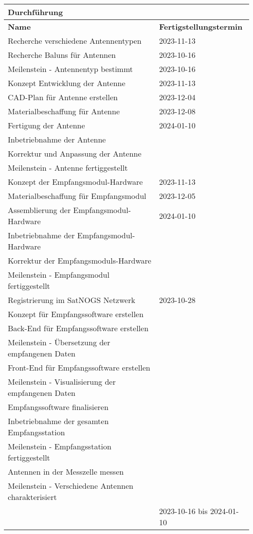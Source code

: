 \begin{table}[!ht]
	\centering
	\begin{tabular}{|l|l|}
		\hline
		\textbf{Durchführung} & ~ \\ \hline
		\textbf{Name} & \textbf{Fertigstellungstermin} \\ \hline
		Recherche verschiedene Antennentypen & 2023-11-13 \\ \hline
		Recherche Baluns für Antennen & 2023-10-16 \\ \hline
		Meilenstein - Antennentyp bestimmt & 2023-10-16 \\ \hline
		Konzept Entwicklung der Antenne & 2023-11-13 \\ \hline
		CAD-Plan für Antenne erstellen & 2023-12-04 \\ \hline
		Materialbeschaffung für Antenne & 2023-12-08 \\ \hline
		Fertigung der Antenne & 2024-01-10 \\ \hline
		Inbetriebnahme der Antenne & ~ \\ \hline
		Korrektur und Anpassung der Antenne & ~ \\ \hline
		Meilenstein - Antenne fertiggestellt & ~ \\ \hline
		Konzept der Empfangsmodul-Hardware & 2023-11-13 \\ \hline
		Materialbeschaffung für Empfangsmodul & 2023-12-05 \\ \hline
		Assemblierung der Empfangsmodul-Hardware & 2024-01-10 \\ \hline
		Inbetriebnahme der Empfangsmodul-Hardware & ~ \\ \hline
		Korrektur der Empfangsmoduls-Hardware & ~ \\ \hline
		Meilenstein - Empfangsmodul fertiggestellt & ~ \\ \hline
		Registrierung im SatNOGS Netzwerk & 2023-10-28 \\ \hline
		Konzept für Empfangssoftware erstellen & ~ \\ \hline
		Back-End für Empfangssoftware erstellen & ~ \\ \hline
		Meilenstein - Übersetzung der empfangenen Daten & ~ \\ \hline
		Front-End für Empfangssoftware erstellen & ~ \\ \hline
		Meilenstein - Visualisierung der empfangenen Daten & ~ \\ \hline
		Empfangssoftware finalisieren & ~ \\ \hline
		Inbetriebnahme der gesamten Empfangsstation & ~ \\ \hline
		Meilenstein - Empfangsstation fertiggestellt & ~ \\ \hline
		Antennen in der Messzelle messen & ~ \\ \hline
		Meilenstein - Verschiedene Antennen charakterisiert & ~ \\ \hline
		~ & 2023-10-16 bis 2024-01-10 \\ \hline
	\end{tabular}
\end{table}

